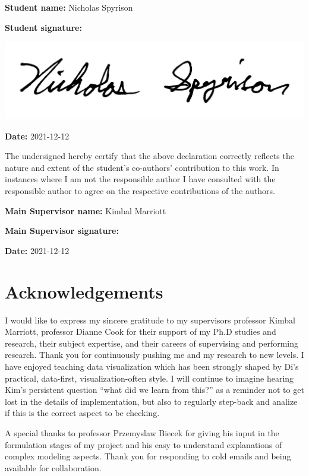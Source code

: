 \documentclass{template/monashthesis}
\begin{document}
\textbf{Student name:} Nicholas Spyrison

\textbf{Student signature:}

\begin{flushleft}\includegraphics[width=0.5\linewidth,]{figures/signature} \end{flushleft}

\textbf{Date:} 2021-12-12

\vspace{2em}

\noindent
The undersigned hereby certify that the above declaration correctly reflects the nature and extent of the student's co-authors' contribution to this work.
In instances where I am not the responsible author I have consulted with the responsible author to agree on the respective contributions of the authors.

\textbf{Main Supervisor name:} Kimbal Marriott

\textbf{Main Supervisor signature:}

\vspace*{2cm}

\textbf{Date:} 2021-12-12

\hypertarget{acknowledgements}{%
\chapter*{Acknowledgements}\label{acknowledgements}}

I would like to express my sincere gratitude to my supervisors professor Kimbal Marriott, professor Dianne Cook for their support of my Ph.D studies and research, their subject expertise, and their careers of supervising and performing research. Thank you for continuously pushing me and my research to new levels. I have enjoyed teaching data visualization which has been strongly shaped by Di's practical, data-first, visualization-often style. I will continue to imagine hearing Kim's persistent question ``what did we learn from this?'' as a reminder not to get lost in the details of implementation, but also to regularly step-back and analize if this is the correct aspect to be checking.

A special thanks to professor Przemyslaw Biecek for giving his input in the formulation stages of my project and his easy to understand explanations of complex modeling aspects. Thank you for responding to cold emails and being available for collaboration.
\end{document}

